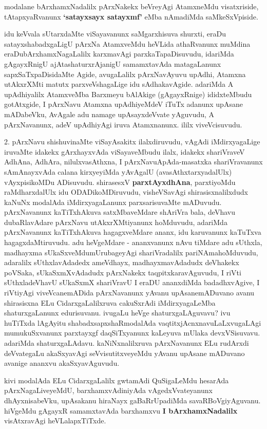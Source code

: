 
\begin{artha}
modalane bArxhamxNadalilx pArxNakekx beVreyAgi AtamxneMdu
visatxriside, tAtapxyaRvanunx \textbf{`satayxsayx satayxmf'} eMba nAmadiMda
saMkeSxVpiside. 

idu keVvala sUtarxdaMte viSayavanunx saMgarxhisuva shurxti, eraDu
satayxshabadxgaLigU pArxNa AtamxveMdu heVLida athaRvanunx muMdina
eraDubArxhamxNagaLalilx karxmavAgi parxkaTapaDisuvudu, idariMda
gAgayxRnigU ajAtashaturxrAjanigU samamxtavAda matagaLanunx
sapxSaTxpaDisidaMte Agide, avugaLalilx pArxNavAyuvu upAdhi, Atamxna
utAkxrXMti matutx parxveVshagaLige idu sAdhakavAgide. adariMda A
upAdhiyalilx AtamxveMba Barxmeyu bAlAkige (gAgayxRnige) ididxteMbudu
gotAtxgide, I pArxNavu Atamxna upAdhiyeMdeV iTuTx adanunx upAsane
mADabeVku, AvAgale adu namage upAsayxdeVvate yAguvudu, A pArxNavanunx,
adeV upAdhiyAgi iruva Atamxnanunx. ililx viveVcisuvudu.
\end{artha}


\centerline{}

\begin{artha}
2. pArxNavu shishuvinaMte viSayAsakitx ilalxdiruvudu, vAgAdi
iMdirxyagaLige iruvaMte idakekx gArxhayxvAda viSayaveMbudu ilalx,
idakekx shariVraveV AdhAna, AdhAra, nilulxvasAthxna, I pArxNavuApAda-masatxka shariVravanunx sAmAnayxvAda calana kirxyeyiMda
yAvAgalU (avasAthxtarxyadalUlx) vAyxpisikoMDu ADisuvudu. shirasesxV
\textbf{parxtAyxdhAna}, parxtiyoMdu raMdharxdalUlx idu ODADikoMDiruvudu,
visheVSavAgi shirasisxnalilxdudx kaNuNx modalAda iMdirxyagaLanunx
parxsarisuvaMte mADuvudu. pArxNavanunx kaTiTxhAkuva satxMbaveMdare
shAriVra bala, deVhavu dubaRlavAdare  pArxNavu utAkxrXMtiyanunx
hoMduvudu, adariMda pArxNavanunx kaTiTxhAkuva hagagxveMdare ananx, idu
karuvanunx kaTuTxva hagagxdaMtiruvudu. adu heVgeMdare - ananxvanunx
nAvu tiMdare adu sUthxla, madhayxma sUkaSxveMdu\break mUrubageyAgi
shariVradalilx pariNAmahoMduvudu, adaralilx sUthxlavAdadedx ameVdhayx,
madhayxmavAdadudx deVhakekx poVSaka, sUkaSxmXvAdadudx pArxNakekx
taqpitxkaravAguvudu, I riVti sUthxladeVhavU  sUkaSxmX shariVravU I
eraDU ananxdiMda badadhxvAgive, I riVtiyAgi viveVcanemADida
pArxNavanunx yAvanu upAsanemADuvano avanu shirasisxna ELu
CidarxgaLalilxruva cakuSxrAdi iMdirxyagaLeMba shaturxgaLanunx
edurisuvanu. ivugaLu heVge shaturxgaLAguvavu? ivu huTiTxda lAgAyitu
shabadxsapxshaRmodalAda vaqtitxjAcnxnavuLaLxvugaLAgi mumukuSxvanunx
parxtayxgf daqSiTxyanunx kaLeyuva mUlaka devxVSisuvavu. adariMda
shaturxgaLAdavu. kaNiNxnalilxruva pArxNavanunx ELu rudArxdi deVvategaLu
akaSxyavAgi  seVvisutitxveyeMdu yAvanu upAsane mADuvano avanige
ananxvu akaSxyavAguvudu.

kivi modalAda ELu CidarxgaLalilx gwtamAdi QuSigaLeMdu hesarAda pArxNagaLiveyeMdU, barxhamxvAdiniyAda
vAgedxVvateyanunx dhAyxnisabeVku, upAsakanu hiraNayx gaBaRrUpadiMda
savaRBoVgiyAguvanu. hiVgeMdu gAgayxR samamxtavAda barxhamxvu \textbf{I bArxhamxNadalilx} 
visAtxravAgi heVLalapxTiTxde.
\end{artha}

